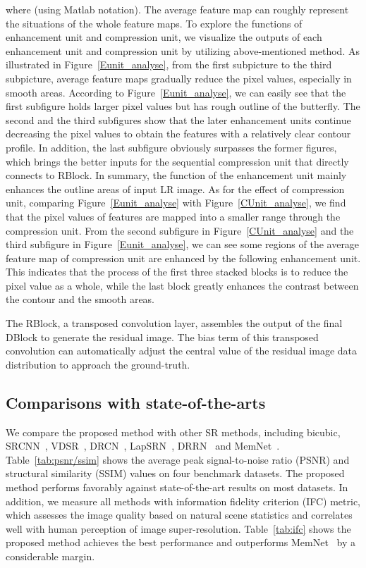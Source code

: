 \documentclass[10pt,twocolumn,letterpaper]{article}
\begin{document}
where  (using Matlab notation). The average feature map can roughly represent the situations of the whole feature maps. To explore the functions of enhancement unit and compression unit, we visualize the outputs of each enhancement unit and compression unit by utilizing above-mentioned method.  As illustrated in Figure~\ref{Eunit_analyse}, from the first subpicture to the third subpicture, average feature maps gradually reduce the pixel values, especially in smooth areas. According to Figure~\ref{Eunit_analyse}, we can easily see that the first subfigure holds larger pixel values but has rough outline of the butterfly. The second and the third subfigures show that the later enhancement units continue decreasing the pixel values to obtain the features with a relatively clear contour profile. In addition, the last subfigure obviously surpasses the former figures, which brings the better inputs for the sequential compression unit that directly connects to RBlock. In summary, the function of the enhancement unit mainly enhances the outline areas of input LR image. As for the effect of compression unit, comparing Figure~\ref{Eunit_analyse} with Figure~\ref{CUnit_analyse}, we find that the pixel values of features are mapped into a smaller range through the compression unit. From the second subfigure in Figure~\ref{CUnit_analyse} and the third subfigure in Figure~\ref{Eunit_analyse}, we can see some regions of the average feature map of compression unit are enhanced by the following enhancement unit. This indicates that the process of the first three stacked blocks is to reduce the pixel value as a whole, while the last block greatly enhances the contrast between the contour and the smooth areas.

The RBlock, a transposed convolution layer, assembles the output of the final DBlock to generate the residual image. The bias term of this transposed convolution can automatically adjust the central value of the residual image data distribution to approach the ground-truth.

\subsection{Comparisons with state-of-the-arts}
We compare the proposed method with other SR methods, including bicubic, SRCNN~\cite{SRCNN,SRCNN-Ex}, VDSR~\cite{VDSR}, DRCN~\cite{DRCN}, LapSRN~\cite{LapSRN}, DRRN~\cite{DRRN} and MemNet~\cite{MemNet}. Table~\ref{tab:psnr/ssim} shows the average peak signal-to-noise ratio (PSNR) and structural similarity (SSIM) values on four benchmark datasets. The proposed method performs favorably against state-of-the-art results on most datasets. In addition, we measure all methods with information fidelity criterion (IFC) metric, which assesses the image quality based on natural scene statistics and correlates well with human perception of image super-resolution. Table~\ref{tab:ifc} shows the proposed method achieves the best performance and outperforms MemNet~\cite{MemNet} by a considerable margin.
\end{document}
